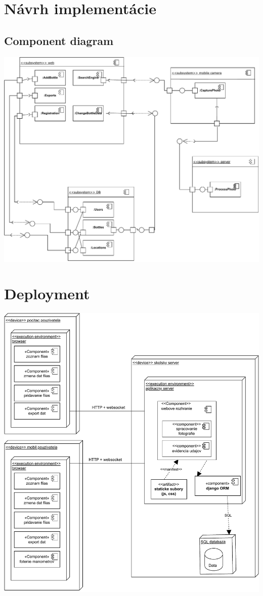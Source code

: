 \documentclass{zah}
\begin{document}
\section{Návrh implementácie}

\subsection{Component diagram}
\includegraphics[width=\textwidth]{navrh-assets/component}

\section{Deployment}
\includegraphics[width=\textwidth]{navrh-assets/deployment}
\end{document}
